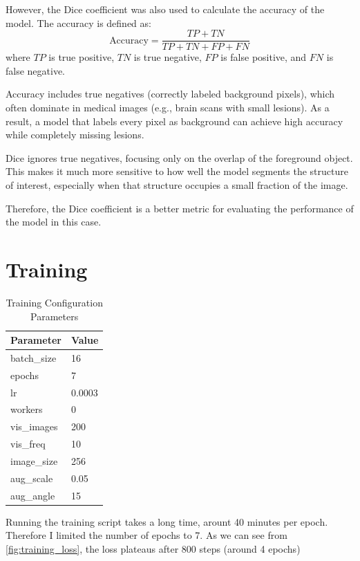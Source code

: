 \documentclass[11pt,a4paper]{article}
\begin{document}
However, the Dice coefficient was also used to calculate the accuracy of the model. The accuracy is defined as:
\begin{equation}
    \text{Accuracy} = \frac{TP + TN}{TP + TN + FP + FN}
\end{equation}
where \(TP\) is true positive, \(TN\) is true negative, \(FP\) is false positive, and \(FN\) is false negative.

Accuracy includes true negatives (correctly labeled background pixels), which often dominate in medical images (e.g., brain scans with small lesions). As a result, a model that labels every pixel as background can achieve high accuracy while completely missing lesions.

Dice ignores true negatives, focusing only on the overlap of the foreground object. This makes it much more sensitive to how well the model segments the structure of interest, especially when that structure occupies a small fraction of the image.

Therefore, the Dice coefficient is a better metric for evaluating the performance of the model in this case.

\section{Training}
\begin{table}[H]
    \centering
    \begin{tabular}{ll}
    \toprule
    \textbf{Parameter} & \textbf{Value} \\
    \midrule
    batch\_size   & 16 \\
    epochs        & 7 \\
    lr            & 0.0003 \\
    workers       & 0 \\
    vis\_images   & 200 \\
    vis\_freq     & 10 \\
    image\_size   & 256 \\
    aug\_scale    & 0.05 \\
    aug\_angle    & 15 \\
    \bottomrule
    \end{tabular}
    \caption{Training Configuration Parameters}
    \label{tab:args}
\end{table}
    
Running the training script takes a long time, arount 40 minutes per epoch. Therefore I limited the number of epochs to 7. As we can see from \autoref{fig:training_loss}, the loss plateaus after 800 steps (around 4 epochs)
\end{document}
